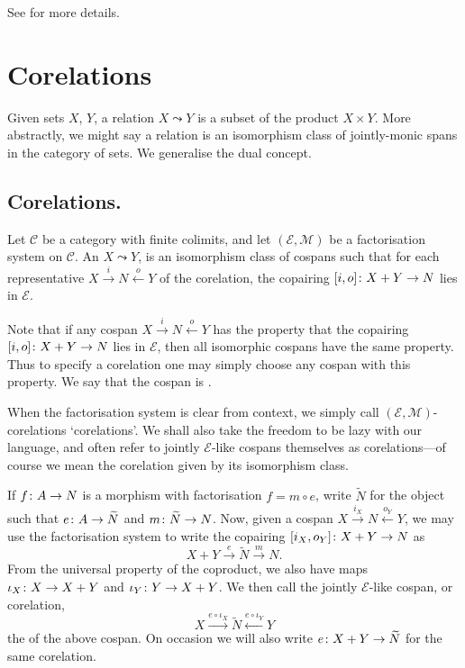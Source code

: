 See \cite[]{AHS} for more details.

\section{Corelations}

Given sets $X$, $Y$, a relation $X \leadsto Y$ is a subset of the product $X
\times Y$. More abstractly, we might say a relation is an isomorphism class of
jointly-monic spans in the category of sets. We generalise the dual concept.

\subsection{Corelations.}
\begin{definition}
  Let $\mathcal C$ be a category with finite colimits, and let $(\mathcal E,
  \mathcal M)$ be a factorisation system on $\mathcal C$. An  $X \leadsto Y$, is an isomorphism class of cospans
  such that for each representative $X \stackrel{i}\longrightarrow N
  \stackrel{o}\longleftarrow Y$ of the corelation, the copairing $[i,o]{\colon} X+Y
  \to N$ lies in $\mathcal E$.
\end{definition}

Note that if any cospan $X \stackrel{i}\longrightarrow N
\stackrel{o}\longleftarrow Y$ has the property that the copairing $[i,o]{\colon}
X+Y \to N$ lies in $\mathcal E$, then all isomorphic cospans have the same
property. Thus to specify a corelation one may simply choose any cospan with
this property. We say that the cospan is .

When the factorisation system is clear from context, we simply call $(\mathcal
E,\mathcal M)$-corelations `corelations'. We shall also take the freedom to be
lazy with our language, and often refer to jointly $\mathcal E$-like cospans
themselves as corelations---of course we mean the corelation given by its
isomorphism class.

If $f{\colon} A \to N$ is a morphism with factorisation $f = m \circ e$, write
$\widetilde N$ for the object such that $e{\colon} A \to \widetilde N$ and $m{\colon}
\widetilde N \to N$. Now, given a cospan $X \stackrel{i_X}{\longrightarrow} N
\stackrel{o_Y}{\longleftarrow} Y$, we may use the factorisation system to write
the copairing $[i_X,o_Y]{\colon} X+Y \to N$ as
\[
  X+Y \stackrel{e}{\longrightarrow} \widetilde{N} \stackrel{m}{\longrightarrow}
  N.
\]
From the universal property of the coproduct, we also have maps $\iota_X{\colon} X
\to X+Y$ and $\iota_Y{\colon} Y \to X+Y$. We then call the jointly $\mathcal
E$-like cospan, or corelation,
\[
  X \stackrel{e\circ \iota_X}{\longrightarrow} \widetilde{N} \stackrel{e \circ
  \iota_Y}{\longleftarrow} Y
\]
the  of the above cospan. On occasion we will also
write $e{\colon} X+Y \to \widetilde N$ for the same corelation.

